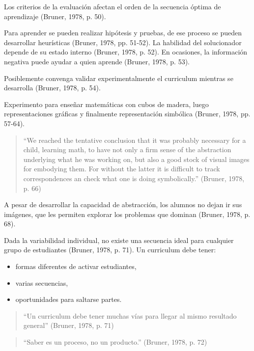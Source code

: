 \documentclass[
  12,
]{scrartcl}
\providecommand{\tightlist}{%
  \setlength{\itemsep}{0pt}\setlength{\parskip}{0pt}}
\begin{document}
Los criterios de la evaluación afectan el orden de la secuencia óptima
de aprendizaje (Bruner, 1978, p. 50).

Para aprender se pueden realizar hipótesis y pruebas, de ese proceso se
pueden desarrollar heurísticas (Bruner, 1978, pp. 51-52). La habilidad
del solucionador depende de su estado interno (Bruner, 1978, p. 52). En
ocasiones, la información negativa puede ayudar a quien aprende (Bruner,
1978, p. 53).

Posiblemente convenga validar experimentalmente el curriculum mientras
se desarrolla (Bruner, 1978, p. 54).

Experimento para enseñar matemáticas con cubos de madera, luego
representaciones gráficas y finalmente representación simbólica (Bruner,
1978, pp. 57-64).

\begin{quote}
``We reached the tentative conclusion that it was probably necessary for
a child, learning math, to have not only a firm sense of the abstraction
underlying what he was working on, but also a good stock of visual
images for embodying them. For without the latter it is difficult to
track correspondences an check what one is doing symbolically.''
(Bruner, 1978, p. 66)
\end{quote}

A pesar de desarrollar la capacidad de abstracción, los alumnos no dejan
ir sus imágenes, que les permiten explorar los problemas que dominan
(Bruner, 1978, p. 68).

Dada la variabilidad individual, no existe una secuencia ideal para
cualquier grupo de estudiantes (Bruner, 1978, p. 71). Un curriculum debe
tener:

\begin{itemize}
\tightlist
\item
  formas diferentes de activar estudiantes,
\item
  varias secuencias,
\item
  oportunidades para saltarse partes.
\end{itemize}

\begin{quote}
``Un curriculum debe tener muchas vías para llegar al mismo resultado
general'' (Bruner, 1978, p. 71)
\end{quote}

\begin{quote}
``Saber es un proceso, no un producto.'' (Bruner, 1978, p. 72)
\end{quote}
\end{document}
